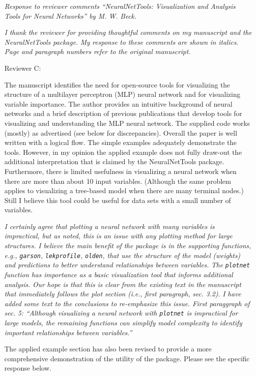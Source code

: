 \documentclass[letterpaper,12pt]{article}
\begin{document}

\raggedright


{\it Response to reviewer comments ``NeuralNetTools: Visualization and Analysis Tools for Neural Networks'' by M. W. Beck.}

{\it I thank the reviewer for providing thoughtful comments on my manuscript and the NeuralNetTools package.  My response to these comments are shown in italics.  Page and paragraph numbers refer to the original manuscript.}

Reviewer C:

The manuscript identifies the need for open-source tools for visualizing the structure of a multilayer perceptron (MLP) neural network and for visualizing variable importance.  The author provides an intuitive background of neural networks and a brief description of previous publications that develop tools for visualizing and understanding the MLP neural network.  The supplied code works (mostly) as advertised (see below for discrepancies).  Overall the paper is well written with a logical flow.  The simple examples adequately demonstrate the tools.  However, in my opinion the applied example does not fully draw-out the additional interpretation that is claimed by the NeuralNetTools package.  Furthermore, there is limited usefulness in visualizing a neural network when there are more than about 10 input variables.  (Although the same problem applies to visualizing a tree-based model when there are many terminal nodes.)  Still I believe this tool could be useful for data sets with a small number of variables.

{\it I certainly agree that plotting a neural network with many variables is impractical, but as noted, this is an issue with any plotting method for large structures.  I believe the main benefit of the package is in the supporting functions, e.g., \texttt{garson}, \texttt{lekprofile}, \texttt{olden}, that use the structure of the model (weights) and predictions to better understand relationships between variables. The \texttt{plotnet} function has importance as a basic visualization tool that informs additional analysis. Our hope is that this is clear from the existing text in the manuscript that immediately follows the plot section (i.e., first paragraph, sec. 3.2).  I have added some text to the conclusions to re-emphasize this issue. First paraggraph of sec. 5: ``Although visualizing a neural network with \texttt{plotnet} is impractical for large models, the remaining functions can simplify model complexity to identify important relationships between variables.''

The applied example section has also been revised to provide a more comprehensive demonstration of the utility of the package.  Please see the specific response below.
}
\end{document}
